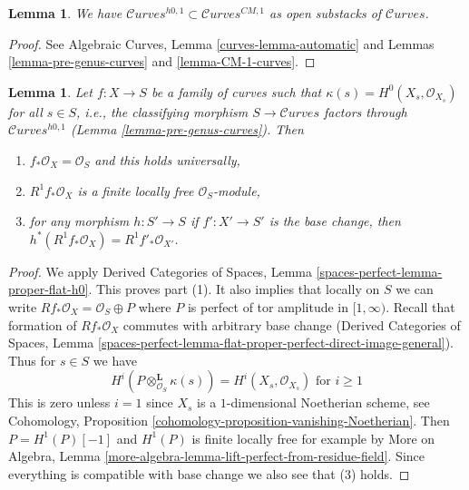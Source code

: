\documentclass{stacks-project}
\theoremstyle{plain}
\newtheorem{lemma}[subsection]{Lemma}
\theoremstyle{definition}
\theoremstyle{remark}
\numberwithin{equation}{subsection}
\def\Curvesstack{\mathcal{C}\!\mathit{urves}}
\begin{document}
\begin{lemma}
\label{lemma-pre-genus-in-CM-1}
We have $\Curvesstack^{h0, 1} \subset \Curvesstack^{CM, 1}$
as open substacks of $\Curvesstack$.
\end{lemma}

\begin{proof}
See Algebraic Curves, Lemma \ref{curves-lemma-automatic} and
Lemmas \ref{lemma-pre-genus-curves} and \ref{lemma-CM-1-curves}.
\end{proof}

\begin{lemma}
\label{lemma-genus}
Let $f : X \to S$ be a family of curves such that
$\kappa(s) = H^0(X_s, \mathcal{O}_{X_s})$ for all $s \in S$, i.e.,
the classifying morphism $S \to \Curvesstack$ factors
through $\Curvesstack^{h0, 1}$ (Lemma \ref{lemma-pre-genus-curves}). Then
\begin{enumerate}
\item $f_*\mathcal{O}_X = \mathcal{O}_S$ and this holds universally,
\item $R^1f_*\mathcal{O}_X$ is a finite locally free $\mathcal{O}_S$-module,
\item for any morphism $h : S' \to S$ if $f' : X' \to S'$ is the base change,
then $h^*(R^1f_*\mathcal{O}_X) = R^1f'_*\mathcal{O}_{X'}$.
\end{enumerate}
\end{lemma}

\begin{proof}
We apply Derived Categories of Spaces, Lemma
\ref{spaces-perfect-lemma-proper-flat-h0}.
This proves part (1). It also implies that locally on $S$
we can write $Rf_*\mathcal{O}_X = \mathcal{O}_S \oplus P$
where $P$ is perfect of tor amplitude in $[1, \infty)$.
Recall that formation of $Rf_*\mathcal{O}_X$ commutes
with arbitrary base change
(Derived Categories of Spaces, Lemma
\ref{spaces-perfect-lemma-flat-proper-perfect-direct-image-general}).
Thus for $s \in S$ we have
$$
H^i(P \otimes_{\mathcal{O}_S}^\mathbf{L} \kappa(s)) =
H^i(X_s, \mathcal{O}_{X_s})
\text{ for }i \geq 1
$$
This is zero unless $i = 1$ since $X_s$ is a $1$-dimensional
Noetherian scheme, see
Cohomology, Proposition \ref{cohomology-proposition-vanishing-Noetherian}.
Then $P = H^1(P)[-1]$ and $H^1(P)$ is finite locally free
for example by More on Algebra, Lemma
\ref{more-algebra-lemma-lift-perfect-from-residue-field}.
Since everything is compatible with base change we
also see that (3) holds.
\end{proof}
\end{document}
